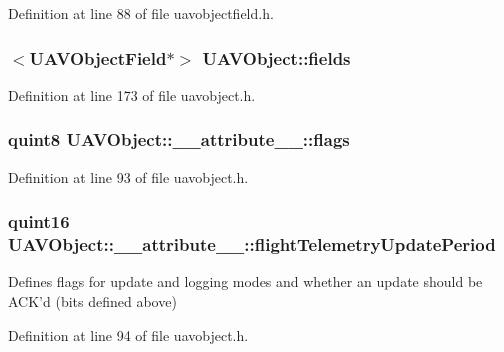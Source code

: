 Definition at line 88 of file uavobjectfield.\-h.

\hypertarget{group___u_a_v_objects_plugin_gaafc65699167bc5cedfd058400e484df6}{
\subsubsection[{fields}]{$<${\bf U\-A\-V\-Object\-Field}$\ast$$>$ U\-A\-V\-Object\-::fields\hspace{0.3cm}{\ttfamily [protected]}}}\label{group___u_a_v_objects_plugin_gaafc65699167bc5cedfd058400e484df6}


Definition at line 173 of file uavobject.\-h.

\hypertarget{group___u_a_v_objects_plugin_gaf5421bbd1e8748b9f0f12ba5b6722bdd}{
\subsubsection[{flags}]{\setlength{\rightskip}{0pt plus 5cm}quint8 U\-A\-V\-Object\-::\-\_\-\-\_\-attribute\-\_\-\-\_\-\-::flags}}\label{group___u_a_v_objects_plugin_gaf5421bbd1e8748b9f0f12ba5b6722bdd}


Definition at line 93 of file uavobject.\-h.

\hypertarget{group___u_a_v_objects_plugin_gaa29a38fd35ce73e9e4afd2698de44797}{
\subsubsection[{flight\-Telemetry\-Update\-Period}]{\setlength{\rightskip}{0pt plus 5cm}quint16 U\-A\-V\-Object\-::\-\_\-\-\_\-attribute\-\_\-\-\_\-\-::flight\-Telemetry\-Update\-Period}}\label{group___u_a_v_objects_plugin_gaa29a38fd35ce73e9e4afd2698de44797}
Defines flags for update and logging modes and whether an update should be A\-C\-K'd (bits defined above) 

Definition at line 94 of file uavobject.\-h.

